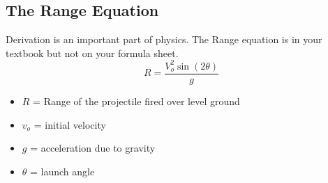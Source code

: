 \subsection{The Range Equation}
Derivation is an important part of physics. The Range equation is in your textbook but not on your formula sheet. \[R=\frac{V_o^2\sin(2\theta)}{g}\]
\begin{itemize}
	\item $R$ = Range of the projectile fired over level ground
	\item $v_o$ = initial velocity
	\item $g$ = acceleration due to gravity
	\item $\theta$ = launch angle
\end{itemize}